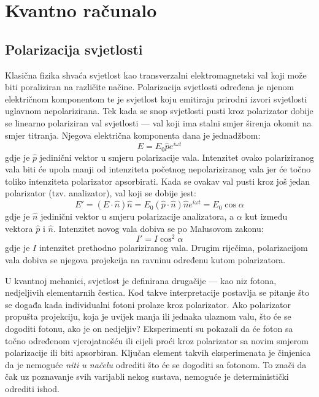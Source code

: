 \chapter{Kvantno računalo}

\section{Polarizacija svjetlosti}

Klasična fizika shvaća svjetlost kao transverzalni elektromagnetski val koji može biti poraliziran na različite načine. Polarizacija svjetlosti određena je njenom električnom komponentom te je svjetlost koju emitiraju prirodni izvori svjetlosti uglavnom nepolarizirana. Tek kada se snop svjetlosti pusti kroz polarizator dobije se linearno polariziran val svjetlosti --- val koji ima stalni smjer širenja okomit na smjer titranja. Njegova električna komponenta dana je jednadžbom:
\begin{equation}
E = E_0 \hat{p}e^{i\omega t}
\end{equation}
gdje je $\hat{p}$ jedinični vektor u smjeru polarizacije vala. Intenzitet ovako polariziranog vala biti će upola manji od intenziteta početnog nepolariziranog vala jer će točno toliko intenziteta polarizator apsorbirati. Kada se ovakav val pusti kroz još jedan polarizator (tzv. analizator), val koji se dobije jest:
\begin{equation}
E' = (E \cdot \hat{n}) \hat{n} = E_0 (\hat{p} \cdot \hat{n})\hat{n}e^{i\omega t} = E_0 \cos \alpha
\end{equation}
gdje je $\hat{n}$ jedinični vektor u smjeru polarizacije analizatora, a $\alpha$ kut između vektora $\hat{p}$ i $\hat{n}$. Intenzitet novog vala dobiva se po Malusovom zakonu:
\begin{equation}
I' = I \cos^2 \alpha
\end{equation}
gdje je $I$ intenzitet prethodno polariziranog vala. Drugim riječima, polarizacijom vala dobiva se njegova projekcija na ravninu određenu kutom polarizatora. 

U kvantnoj mehanici, svjetlost je definirana drugačije --- kao niz fotona, nedjeljivih elementarnih čestica. Kod takve interpretacije postavlja se pitanje što se događa kada individualni fotoni prolaze kroz polarizator. Ako polarizator propušta projekciju, koja je uvijek manja ili jednaka ulaznom valu, što će se dogoditi fotonu, ako je on nedjeljiv? Eksperimenti su pokazali da će foton sa točno određenom vjerojatnošću ili cijeli proći kroz polarizator sa novim smjerom polarizacije ili biti apsorbiran. Ključan element takvih eksperimenata je činjenica da je nemoguće \emph{niti u načelu} odrediti što će se dogoditi sa fotonom. To znači da čak uz poznavanje svih varijabli nekog sustava, nemoguće je deterministički odrediti ishod.

